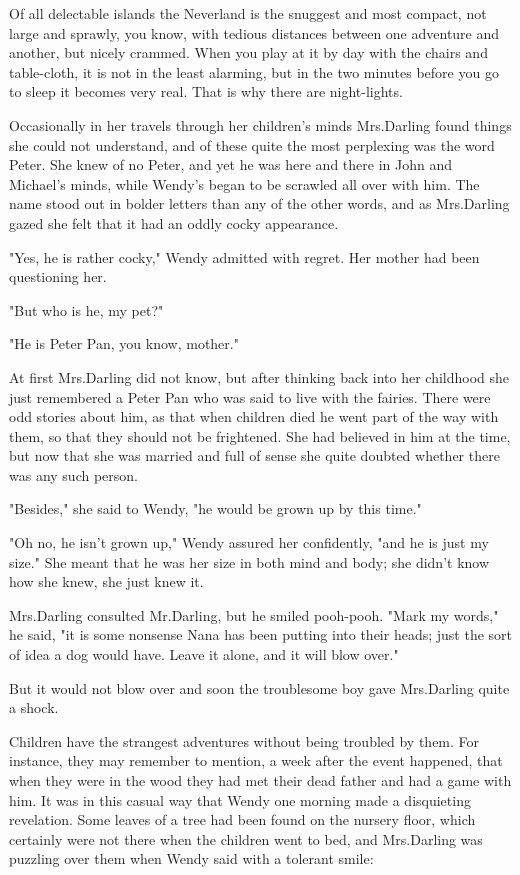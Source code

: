 Of all delectable islands the Neverland is the snuggest and most compact, not large and sprawly, you know, with tedious distances between one adventure and another, but nicely crammed.
When you play at it by day with the chairs and table-cloth, it is not in the least alarming, but in the two minutes before you go to sleep it becomes very real.
That is why there are night-lights.

Occasionally in her travels through her children's minds Mrs.\@ Darling found things she could not understand, and of these quite the most perplexing was the word Peter.
She knew of no Peter, and yet he was here and there in John and Michael's minds, while Wendy's began to be scrawled all over with him.
The name stood out in bolder letters than any of the other words, and as Mrs.\@ Darling gazed she felt that it had an oddly cocky appearance.

"Yes, he is rather cocky," Wendy admitted with regret.
Her mother had been questioning her.

"But who is he, my pet?"

"He is Peter Pan, you know, mother."

At first Mrs.\@ Darling did not know, but after thinking back into her childhood she just remembered a Peter Pan who was said to live with the fairies.
There were odd stories about him, as that when children died he went part of the way with them, so that they should not be frightened.
She had believed in him at the time, but now that she was married and full of sense she quite doubted whether there was any such person.

"Besides," she said to Wendy, "he would be grown up by this time."

"Oh no, he isn't grown up," Wendy assured her confidently, "and he is just my size."
She meant that he was her size in both mind and body;
she didn't know how she knew, she just knew it.

Mrs.\@ Darling consulted Mr.\@ Darling, but he smiled pooh-pooh.
"Mark my words," he said, "it is some nonsense Nana has been putting into their heads;
just the sort of idea a dog would have.
Leave it alone, and it will blow over."

But it would not blow over and soon the troublesome boy gave Mrs.\@ Darling quite a shock.

Children have the strangest adventures without being troubled by them.
For instance, they may remember to mention, a week after the event happened, that when they were in the wood they had met their dead father and had a game with him.
It was in this casual way that Wendy one morning made a disquieting revelation.
Some leaves of a tree had been found on the nursery floor, which certainly were not there when the children went to bed, and Mrs.\@ Darling was puzzling over them when Wendy said with a tolerant smile:

